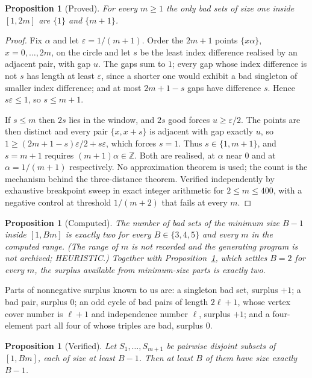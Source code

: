 \documentclass[11pt]{amsart}
\theoremstyle{plain}
\newtheorem{proposition}[theorem]{Proposition}
\theoremstyle{definition}
\begin{document}
\begin{proposition}[Proved]\label{prop:surplus-one}
For every $m\ge1$ the only bad sets of size one inside $[1,2m]$ are $\{1\}$ and $\{m+1\}$.
\end{proposition}

\begin{proof}
Fix $\alpha$ and let $\varepsilon=1/(m+1)$. Order the $2m+1$ points $\{x\alpha\}$, $x=0,\dots,2m$,
on the circle and let $s$ be the least index difference realised by an adjacent pair, with gap $u$.
The gaps sum to $1$; every gap whose index difference is not $s$ has length at least $\varepsilon$,
since a shorter one would exhibit a bad singleton of smaller index difference; and at most
$2m+1-s$ gaps have difference $s$. Hence $s\varepsilon\le1$, so $s\le m+1$.

If $s\le m$ then $2s$ lies in the window, and $2s$ good forces $u\ge\varepsilon/2$. The points are
then distinct and every pair $\{x,x+s\}$ is adjacent with gap exactly $u$, so
$1\ge(2m+1-s)\varepsilon/2+s\varepsilon$, which forces $s=1$. Thus $s\in\{1,m+1\}$, and
$s=m+1$ requires $(m+1)\alpha\in\mathbb{Z}$. Both are realised, at $\alpha$ near $0$ and at
$\alpha=1/(m+1)$ respectively. No approximation theorem is used; the count is the mechanism behind
the three-distance theorem. Verified independently by exhaustive breakpoint sweep in exact integer
arithmetic for $2\le m\le400$, with a negative control at threshold $1/(m+2)$ that fails at every
$m$.
\end{proof}

\begin{proposition}[Computed]\label{prop:surplus-two}
The number of bad sets of the minimum size $B-1$ inside $[1,Bm]$ is exactly two for every
$B \in \{3,4,5\}$ and every $m$ in the computed range. (The range of $m$ is not recorded and the generating program is not archived; HEURISTIC.) Together with
Proposition~\ref{prop:surplus-one}, which settles $B=2$ for every $m$, the surplus available from
minimum-size parts is exactly two.
\end{proposition}

Parts of nonnegative surplus known to us are: a singleton bad set, surplus $+1$; a bad pair,
surplus $0$; an odd cycle of bad pairs of length $2\ell+1$, whose vertex cover number is $\ell+1$
and independence number $\ell$, surplus $+1$; and a four-element part all four of whose triples are
bad, surplus $0$.

\begin{proposition}[Verified]\label{prop:packing}
Let $S_1,\dots,S_{m+1}$ be pairwise disjoint subsets of $[1,Bm]$, each of size at least $B-1$. Then
at least $B$ of them have size exactly $B-1$.
\end{proposition}
\end{document}
